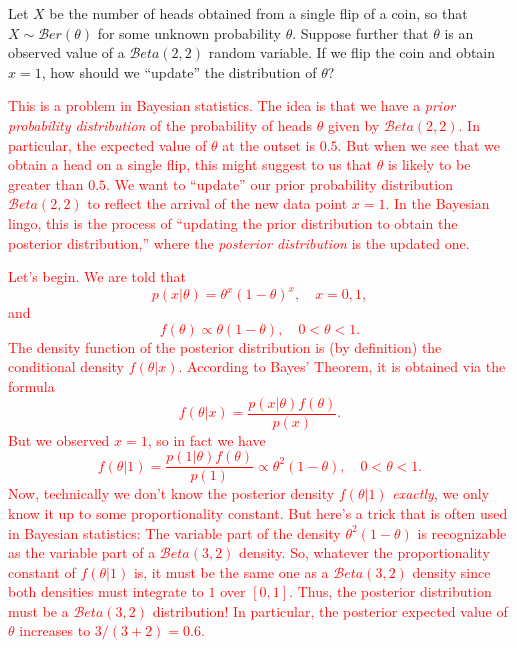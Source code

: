 \documentclass[12pt,reqno]{amsart}
\begin{document}
\prob Let $X$ be the number of heads obtained from a single flip of a coin, so that $X\sim \mathcal{B}er(\theta)$ for some unknown probability $\theta$. Suppose further that $\theta$ is an observed value of a $\mathcal{B}eta(2,2)$ random variable. If we flip the coin and obtain $x=1$, how should we ``update'' the distribution of $\theta$?

\bigskip
\textcolor{red}{This is a problem in Bayesian statistics. The idea is that we have a \textit{prior probability distribution} of the probability of heads $\theta$ given by $\mathcal{B}eta(2,2)$. In particular, the expected value of $\theta$ at the outset is $0.5$. But when we see that we obtain a head on a single flip, this might suggest to us that $\theta$ is likely to be greater than $0.5$. We want to ``update'' our prior probability distribution $\mathcal{B}eta(2,2)$ to reflect the arrival of the new data point $x=1$. In the Bayesian lingo, this is the process of ``updating the prior distribution to obtain the posterior distribution,'' where the \textit{posterior distribution} is the updated one.}

\bigskip
\textcolor{red}{Let's begin. We are told that
	\[
	p(x|\theta) = \theta^x (1-\theta)^x, \quad x=0,1,
	\]
and
	\[
	f(\theta) \propto \theta(1-\theta), \quad 0 < \theta < 1.
	\]
The density function of the posterior distribution is (by definition) the conditional density $f(\theta|x)$. According to Bayes' Theorem, it is obtained via the formula
	\[
	f(\theta|x) = \frac{p(x|\theta)f(\theta)}{p(x)}.
	\]
But we observed $x=1$, so in fact we have
	\[
	f(\theta|1) = \frac{p(1|\theta)f(\theta)}{p(1)} \propto \theta^2 ( 1-\theta), \quad 0 < \theta < 1.
	\]
Now, technically we don't know the posterior density $f(\theta|1)$ \textit{exactly}, we only know it up to some proportionality constant. But here's a trick that is often used in Bayesian statistics: The variable part of the density $\theta^2(1-\theta)$ is recognizable as the variable part of a $\mathcal{B}eta(3,2)$ density. So, whatever the proportionality constant of $f(\theta|1)$ is, it must be the same one as a $\mathcal{B}eta(3,2)$ density since both densities must integrate to $1$ over $[0,1]$. Thus, the posterior distribution must be a $\mathcal{B}eta(3,2)$ distribution! In particular, the posterior expected value of $\theta$ increases to $3/(3+2) = 0.6$.}
\bigskip
\end{document}
